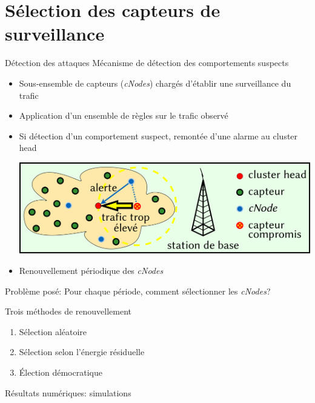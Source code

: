 \documentclass[aspectratio=43]{beamer} %
\newcommand\ch{cluster head\xspace}
\newcommand\cns{\textit{cNodes}\xspace}
\newcommand\cnsns{\textit{cNodes}}
\begin{document}
\section[Mécanismes]{Sélection des capteurs de surveillance}
\begin{frame}{Détection des attaques}
  \small
  Mécanisme de détection des comportements suspects
  \begin{itemize}
    \item Sous-ensemble de capteurs (\alert{\cnsns}) chargés d'établir une surveillance du trafic
    \item Application d'un ensemble de \alert{règles} sur le trafic observé
    \item Si détection d'un comportement suspect, remontée d'une alarme au \ch
      \smallskip
      \begin{center}
        \includegraphics[height=.3\textheight]{Figs/WSN_detection.pdf}
      \end{center}
    \item \alert{Renouvellement périodique des \cns}
  \end{itemize}
  \begin{block}{Problème posé:}
    Pour chaque période, comment sélectionner les \cns?
  \end{block}
\end{frame}
\begin{frame}{Trois méthodes de renouvellement}
  \begin{enumerate}
    \item Sélection aléatoire
    \item Sélection selon l'énergie résiduelle
    \item Élection démocratique
  \end{enumerate}
  Résultats numériques: simulations
\end{frame}
\end{document}
